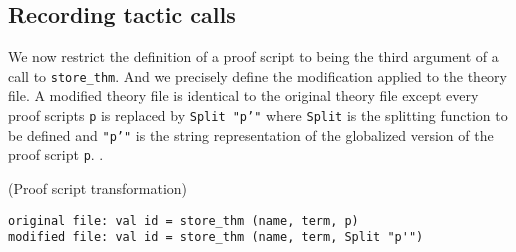 \documentclass[runningheads,a4paper,draft]{svjour3}
\def\sml{\textsf{SML}\xspace}
\begin{document}
%
%
%
%
%
%
%  
%
%
%
%
%
%
%
%
%
%
%
%


\subsection{Recording tactic calls}

We now restrict the definition of a proof script to being the third 
argument of a call to \texttt{store\_thm}. And we precisely define the 
modification applied to the theory file. A modified theory file is identical to 
the original theory file except every proof scripts \texttt{p} is
replaced by \texttt{Split "p'"} where \texttt{Split} is the splitting function 
to be defined and \texttt{"p'"} is the string representation of the globalized 
version of the proof script 
\texttt{p}. 
.
\begin{example}(Proof script transformation)
\begin{lstlisting}[language=SMLSmall,frame=tb]
original file: val id = store_thm (name, term, p)
modified file: val id = store_thm (name, term, Split "p'")
\end{lstlisting}
\end{example}
\end{document}
